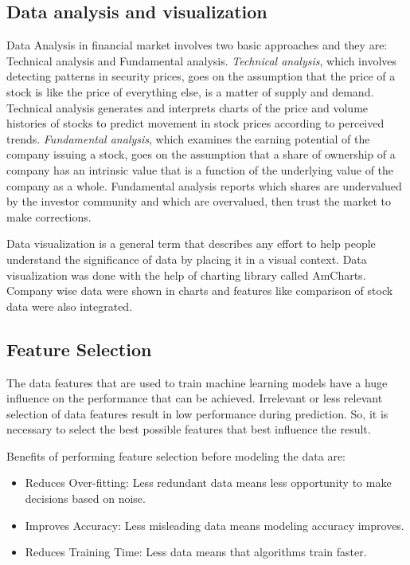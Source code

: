 \subsection{Data analysis and visualization}
Data Analysis in financial market involves two basic approaches and they are: Technical analysis and Fundamental analysis. \textit{Technical analysis}, which involves detecting patterns in security prices, goes on the assumption that the price of a stock is like the price of everything else, is a matter of supply and demand. Technical analysis generates and interprets charts of the price and volume histories of stocks to predict movement in stock prices according to perceived trends. \textit{Fundamental analysis}, which examines the earning potential of the company issuing a stock, goes on the assumption that a share of ownership of a company has an intrinsic value that is a function of the underlying value of the company as a whole. Fundamental analysis reports which shares are undervalued by the investor community and which are overvalued, then trust the market to make corrections.

Data visualization is a general term that describes any effort to help people understand the significance of data by placing it in a visual context. Data visualization was done with the help of charting library called AmCharts. Company wise data were shown in charts and features like comparison of stock data were also integrated.

\subsection{Feature Selection}
The data features that are used to train  machine learning models have a huge influence on the performance that can be achieved. Irrelevant or less relevant selection of data features result in low performance during prediction. So, it is necessary to select the best possible features that best influence the result.

Benefits of performing feature selection before modeling the data are:
\begin{itemize}
	\item Reduces Over-fitting: Less redundant data means less opportunity to make decisions based on noise. 
	\item Improves Accuracy: Less misleading data means modeling accuracy improves. 
	\item Reduces Training Time: Less data means that algorithms train faster. 
\end{itemize}

